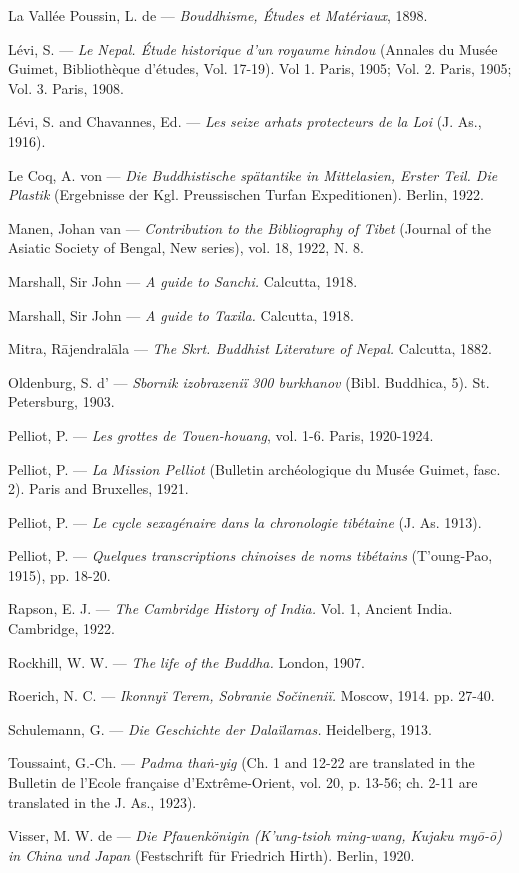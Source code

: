 \documentclass[a4paper, 12pt, oneside]{article}
\begin{document}
La Vallée Poussin, L. de --- \emph{Bouddhisme, Études et Matériaux}, 1898.

Lévi, S. --- \emph{Le Nepal. Étude historique d'un royaume hindou} (Annales du Musée Guimet, Bibliothèque d'études, Vol. 17-19). Vol 1. Paris, 1905; Vol. 2. Paris, 1905; Vol. 3. Paris, 1908.

Lévi, S. and Chavannes, Ed. --- \emph{Les seize arhats protecteurs de la Loi} (J. As., 1916).

Le Coq, A. von --- \emph{Die Buddhistische spätantike in Mittelasien, Erster Teil. Die Plastik} (Ergebnisse der Kgl. Preussischen Turfan Expeditionen). Berlin, 1922.

Manen, Johan van --- \emph{Contribution to the Bibliography of Tibet} (Journal of the Asiatic Society of Bengal, New series), vol. 18, 1922, N. 8.

Marshall, Sir John --- \emph{A guide to Sanchi.} Calcutta, 1918.

Marshall, Sir John --- \emph{A guide to Taxila.} Calcutta, 1918.

Mitra, R\={a}jendral\={a}la --- \emph{The Skrt. Buddhist Literature of Nepal.} Calcutta, 1882.

Oldenburg, S. d' --- \emph{Sbornik izobrazeniï 300 burkhanov} (Bibl. Buddhica, 5). St. Petersburg, 1903.

Pelliot, P. --- \emph{Les grottes de Touen-houang}, vol. 1-6. Paris, 1920-1924.

Pelliot, P. --- \emph{La Mission Pelliot} (Bulletin archéologique du Musée Guimet, fasc. 2). Paris and Bruxelles, 1921.

Pelliot, P. --- \emph{Le cycle sexagénaire dans la chronologie tibétaine} (J. As. 1913).

Pelliot, P. --- \emph{Quelques transcriptions chinoises de noms tibétains} (T'oung-Pao, 1915), pp. 18-20.

Rapson, E. J. --- \emph{The Cambridge History of India.} Vol. 1, Ancient India. Cambridge, 1922.

Rockhill, W. W. --- \emph{The life of the Buddha.} London, 1907.

Roerich, N. C. --- \emph{Ikonnyï Terem, Sobranie Sočineniï.} Moscow, 1914. pp. 27-40.

Schulemann, G. --- \emph{Die Geschichte der Dalaïlamas.} Heidelberg, 1913.

Toussaint, G.-Ch. --- \emph{Padma tha\.{n}-yig} (Ch. 1 and 12-22 are translated in the Bulletin de l'Ecole française d'Extrême-Orient, vol. 20, p. 13-56; ch. 2-11 are translated in the J. As., 1923).

Visser, M. W. de --- \emph{Die Pfauenkönigin (K'ung-tsioh ming-wang, Kujaku my\={o}-\={o}) in China und Japan} (Festschrift für Friedrich Hirth). Berlin, 1920.
\end{document}
